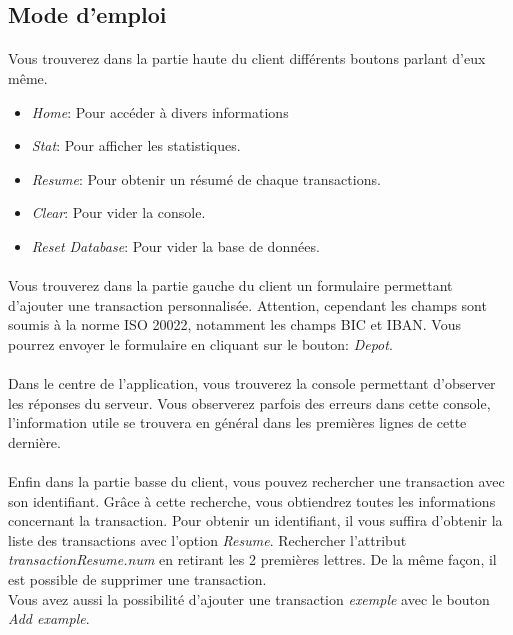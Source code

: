 \documentclass{article}
\begin{document}
    \subsection{Mode d’emploi}
      \paragraph{}
	Vous trouverez dans la partie haute du client différents boutons parlant d'eux même. 
	\begin{itemize}
	 \item \emph{Home}: Pour accéder à divers informations
	 \item \emph{Stat}: Pour afficher les statistiques.
	 \item \emph{Resume}: Pour obtenir un résumé de chaque transactions.
	 \item \emph{Clear}: Pour vider la console.
	 \item \emph{Reset Database}: Pour vider la base de données.
	\end{itemize}

      \paragraph{}
	Vous trouverez dans la partie gauche du client un formulaire permettant d'ajouter une transaction personnalisée.
	Attention, cependant les champs sont soumis à la norme ISO 20022, notamment les champs BIC et IBAN.
	Vous pourrez envoyer le formulaire en cliquant sur le bouton: \emph{Depot}.
      \paragraph{}
	Dans le centre de l'application, vous trouverez la console permettant d'observer les réponses du serveur.
	Vous observerez parfois des erreurs dans cette console, l'information utile se trouvera en général dans les premières lignes de cette dernière.
      \paragraph{}
	Enfin dans la partie basse du client, vous pouvez rechercher une transaction avec son identifiant.
	Grâce à cette recherche, vous obtiendrez toutes les informations concernant la transaction.
	Pour obtenir un identifiant, il vous suffira d'obtenir la liste des transactions avec l'option \emph{Resume}.
	Rechercher l'attribut \emph{transactionResume.num} en retirant les 2 premières lettres.
	De la même façon, il est possible de supprimer une transaction.\\
	Vous avez aussi la possibilité d'ajouter une transaction \emph{exemple} avec le bouton \emph{Add example}.
\end{document}
